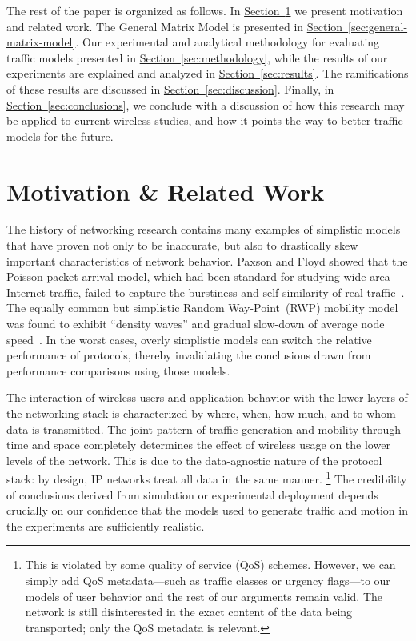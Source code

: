\documentclass[conference]{IEEEtran}
\newcommand{\caps}[1]{{\small{#1}}}
\newcommand{\Section}[1]{\hyperref[sec:#1]{Section~\ref*{sec:#1}}}
\begin{document}
The rest of the paper is organized as follows. In \Section{motivation} we present motivation and related work. The General Matrix Model is presented in \Section{general-matrix-model}. Our experimental and analytical methodology for evaluating traffic models presented in \Section{methodology}, while the results of our experiments are explained and analyzed in \Section{results}. The ramifications of these results are discussed in \Section{discussion}. Finally, in \Section{conclusions}, we conclude with a discussion of how this research may be applied to current wireless studies, and how it points the way to better traffic models for the future.

\section{Motivation \& Related Work}\label{sec:motivation}\label{sec:related-work}

The history of networking research contains many examples of simplistic models that have proven not only to be inaccurate, but also to drastically skew important characteristics of network behavior. Paxson and Floyd showed that the Poisson packet arrival model, which had been standard for studying wide-area Internet traffic, failed to capture the burstiness and self-similarity of real traffic~\cite{Paxson95}. The equally common but simplistic Random Way-Point~(\caps{RWP}) mobility model was found to exhibit ``density waves'' and gradual slow-down of average node speed~\cite{Royer01,Yoon03:speed-decay}. In the worst cases, overly simplistic models can switch the relative performance of protocols, thereby invalidating the conclusions drawn from performance comparisons using those models.

The interaction of wireless users and application behavior with the lower layers of the networking stack is characterized by where, when, how much, and to whom data is transmitted. The joint pattern of traffic generation and mobility through time and space completely determines the effect of wireless usage on the lower levels of the network. This is due to the data-agnostic nature of the protocol stack: by design, \caps{IP} networks treat all data in the same manner.%
\footnote{This is violated by some quality of service (QoS) schemes. However, we can simply add QoS metadata---such as traffic classes or urgency flags---to our models of user behavior and the rest of our arguments remain valid. The network is still disinterested in the exact content of the data being transported; only the QoS metadata is relevant.} The credibility of conclusions derived from simulation or experimental deployment depends crucially on our confidence that the models used to generate traffic and motion in the experiments are sufficiently realistic.
\end{document}
